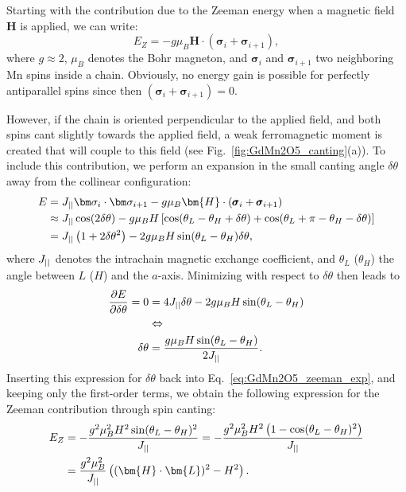Starting with the contribution due to the Zeeman energy when a magnetic field $\bm H$ is applied, we can write:
\begin{equation}
	E_Z = -g \mu_B \bm{H} \cdot (\pmb{\sigma}_i + \pmb{\sigma}_{i+1}),
\end{equation}
where $g \approx 2$, $\mu_B$ denotes the Bohr magneton, and $\bm \sigma_i$ and $\bm \sigma_{i+1}$ two neighboring Mn spins inside a chain. 
Obviously, no energy gain is possible for perfectly antiparallel spins since then $(\pmb{\sigma}_i + \pmb{\sigma}_{i+1})=0$.

However, if the chain is oriented perpendicular to the applied field, and both spins cant slightly towards the applied field, a weak ferromagnetic moment is created that will couple to this field (see Fig.~\ref{fig:GdMn2O5_canting}(a)).
To include this contribution, we perform an expansion in the small canting angle $\delta \theta$ away from the collinear configuration:
\begin{align}
	E &= \Jpar \bm \sigma_i \cdot \bm \sigma_{i+1} -g \mu_B \bm{H} \cdot (\pmb{\sigma}_i + \pmb{\sigma}_{i+1})\nonumber\\
	 &\approx \Jpar \cos(2\delta \theta) - g \mu_B H \left[\cos(\theta_L - \theta_H + \delta \theta) + \cos(\theta_L + \pi - \theta_H - \delta \theta)\right]\nonumber\\
	&= \Jpar \left( 1+2\delta\theta^2 \right) - 2 g \mu_B H \sin(\theta_L - \theta_H)\delta\theta \label{eq:GdMn2O5_zeeman_exp},
\end{align}
where $J_{||}$ denotes the intrachain magnetic exchange coefficient, and $\theta_L$ ($\theta_H$) the angle between $L$ ($H$) and the $a$-axis.
Minimizing with respect to $\delta \theta$ then leads to
\begin{align}
	\frac{\partial E}{\partial \delta \theta} = 0 &= 4 J_{||} \delta \theta - 2 g \mu_B H \sin(\theta_L - \theta_H) \\
	&\Leftrightarrow \nonumber\\
	\delta \theta &= \frac{g\mu_B H \sin(\theta_L - \theta_H)}{2 J_{||}}.
\end{align}
Inserting this expression for $\delta \theta$ back into Eq.~\eqref{eq:GdMn2O5_zeeman_exp}, and keeping only the first-order terms, we obtain the following expression for the Zeeman contribution through spin canting:
\begin{align}
	E_Z &= -\frac{g^2\mu_B^2 H^2 \sin(\theta_L - \theta_H)^2}{\Jpar} = -\frac{g^2\mu_B^2 H^2 \left(1 - \cos(\theta_L - \theta_H)^2\right)}{\Jpar}\nonumber\\
	&=\frac{g^2\mu_B^2}{\Jpar}\left((\bm{H}\cdot\bm{L})^2 - H^2\right)\label{eq:GdMn2O5_Zeeman}.
\end{align}
